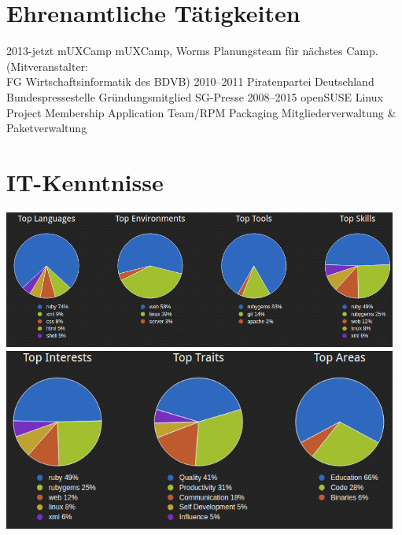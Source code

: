 \documentclass[a4paper,latin]{friggeri-cv} %
\begin{document}
\section{Ehrenamtliche Tätigkeiten}
\begin{entrylist}
\entry
{2013-jetzt}
{mUXCamp}
{mUXCamp, Worms}
{Planungsteam für nächstes Camp. (Mitveranstalter: \\FG Wirtschaftsinformatik des BDVB)}
\entry
{2010--2011}
{Piratenpartei Deutschland}
{Bundespressestelle}
{Gründungsmitglied SG-Presse}
\entry
{2008--2015}
{openSUSE Linux Project}
{Membership Application Team/RPM Packaging}
{Mitgliederverwaltung \& Paketverwaltung}
\end{entrylist}

\newpage

\section{IT-Kenntnisse}

\includegraphics[width=13cm]{../Pictures/Skills1.png} \linebreak
\includegraphics[width=13cm]{../Pictures/Skills2.png}
\end{document}
